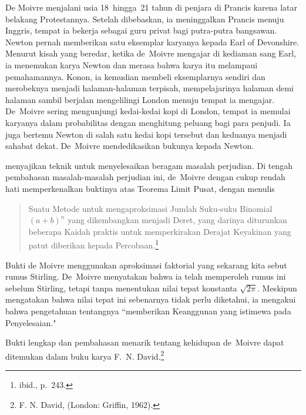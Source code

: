 De Moivre menjalani usia 18~hingga~21 tahun di penjara di Prancis karena latar
belakang Protestannya.  Setelah dibebaskan, ia meninggalkan Prancis menuju Inggris, tempat
ia bekerja sebagai guru privat bagi putra-putra bangsawan.  Newton pernah memberikan satu eksemplar
 karyanya kepada Earl of Devonshire.  Menurut kisah yang beredar,
ketika de~Moivre mengajar di kediaman sang Earl, ia menemukan karya Newton
dan merasa bahwa karya itu melampaui pemahamannya.  Konon, ia kemudian membeli eksemplarnya
sendiri dan merobeknya menjadi halaman-halaman terpisah, mempelajarinya halaman demi halaman sambil berjalan
mengelilingi London menuju tempat ia mengajar.  De~Moivre sering mengunjungi kedai-kedai kopi di
London, tempat ia memulai karyanya dalam probabilitas dengan menghitung peluang bagi para
penjudi.  Ia juga bertemu Newton di salah satu kedai kopi tersebut dan keduanya menjadi
sahabat dekat.  De~Moivre mendedikasikan bukunya kepada Newton.

 menyajikan teknik untuk menyelesaikan beragam
masalah perjudian.  Di tengah pembahasan masalah-masalah perjudian ini,
de~Moivre dengan cukup rendah hati memperkenalkan buktinya atas Teorema Limit Pusat,
dengan menulis
\begin{quote}
Suatu Metode untuk mengaproksimasi Jumlah Suku-suku Binomial $(a + b)^n$
yang dikembangkan menjadi Deret, yang darinya diturunkan beberapa Kaidah praktis untuk
memperkirakan Derajat Keyakinan yang patut diberikan kepada
Percobaan.\footnote{ibid., p.~243.}
\end{quote}
Bukti de Moivre menggunakan aproksimasi faktorial yang sekarang kita sebut
rumus Stirling.  De~Moivre menyatakan bahwa ia telah memperoleh rumus ini sebelum
Stirling, tetapi tanpa menentukan nilai tepat konstanta
$\sqrt{2\pi}$.  Meskipun mengatakan bahwa nilai tepat ini sebenarnya tidak perlu
diketahui, ia mengakui bahwa pengetahuan tentangnya ``memberikan Keanggunan yang istimewa pada
Penyelesaian."
\par
Bukti lengkap dan pembahasan menarik tentang kehidupan 
de~Moivre dapat ditemukan dalam buku  karya F.~N.
David.\footnote{F. N. David,  (London:
Griffin, 1962).}

\pagebreak[4]

